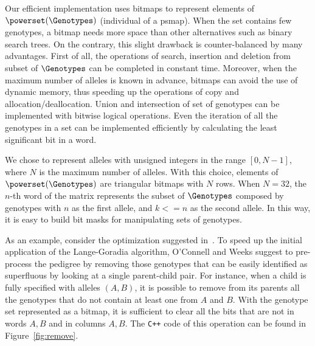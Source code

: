 Our efficient implementation uses bitmaps to represent elements of
$\powerset(\Genotypes)$ (individual of a psmap). When the set contains few
genotypes, a bitmap needs more space than other alternatives such as binary
search trees. On the contrary, this slight drawback is counter-balanced by many
advantages. First of all, the operations of search, insertion and deletion from
subset of $\Genotypes$ can be completed in constant time. Moreover, when the
maximum number of alleles is known in advance, bitmaps can avoid the use of
dynamic memory, thus speeding up the operations of copy and
allocation/deallocation.  Union and intersection of set of genotypes can be
implemented with bitwise logical operations.  Even the iteration of all the
genotypes in a set can be implemented efficiently by calculating the least
significant bit in a word. 

We chose to represent alleles with unsigned integers in the range $[0,N-1]$,
where $N$ is the maximum number of alleles. With this choice, elements of
$\powerset(\Genotypes)$ are triangular bitmaps with $N$ rows.  When $N=32$, the
$n$-th word of the matrix represents the subset of $\Genotypes$ composed by
genotypes with $n$ as the first allele, and $k<=n$ as the second allele. In this
way, it is easy to build bit masks for manipulating sets of genotypes. 

As an example, consider the optimization suggested in~\cite{OConnellWeeks1999}. To
speed up the initial application of the Lange-Goradia algorithm, O'Connell and
Weeks suggest to pre-process the pedigree by removing those genotypes that can
be easily identified as superfluous by looking at a single parent-child pair. For
instance, when a child is fully specified with alleles $(A,B)$, it is possible
to remove from its parents all the genotypes that do not contain at least one
from $A$ and $B$. With the genotype set represented as a bitmap, it is
sufficient to clear all the bits that are not in words $A,B$ and in columns
$A,B$. The \verb|C++| code of this operation can be found in Figure~\ref{fig:remove}.

